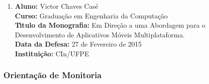 \documentclass[a4paper,oneside,10pt]{article}
\begin{document}
\begin{enumerate}
\item       \textbf{Aluno:} Victor Chaves Casé \mbox{}\\
            \textbf{Curso:} Graduação em Engenharia da Computação\\
            \textbf{T\'{\i}tulo da Monografia:} Em Direção a uma Abordagem para o Desenvolvimento de Aplicativos Móveis Multiplataforma.\\
            \textbf{Data da Defesa:} 27 de Fevereiro de 2015\\
            \textbf{Institui\c{c}\~{a}o:} CIn/UFPE


\end{enumerate}


\subsubsection{Orienta\c{c}\~{a}o de Monitoria}
\vspace{0.3cm}
\end{document}

